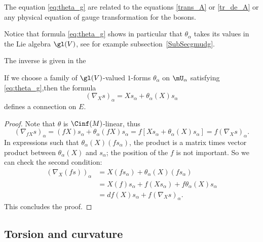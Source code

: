 \begin{normaltext}
	The equation \eqref{eq:theta_g} are related to the equations \eqref{trans_A} or \eqref{tr_de_A} or any physical equation of gauge transformation for the bosons.
\end{normaltext}

\begin{normaltext}
	Notice that formula \eqref{eq:theta_g} shows in particular that $\theta_{\alpha}$ takes its values in the Lie algebra $\gl(V)$, see for example subsection~\ref{SubSecgmudg}.
\end{normaltext}

The inverse is given in the
\begin{proposition}	\label{Propformconnve}
	If we choose a family of $\gl(V)$-valued $1$-forms $\theta_{\alpha}$ on $\mU_{\alpha}$ satisfying \eqref{eq:theta_g},then the formula
	\[
		(\nabla_Xs)_{\alpha}=Xs_{\alpha}+\theta_{\alpha}(X)s_{\alpha}
	\]
	defines a connection on $E$.\label{prop:thet_conn_F}
\end{proposition}

\begin{proof}
	Note that $\theta$ is $\Cinf(M)$-linear, thus
	\begin{equation}
		(\nabla_{fX}s)_{\alpha}=(fX)s_{\alpha}+\theta_{\alpha}(fX)s_{\alpha}
		=f[ Xs_{\alpha}+\theta_{\alpha}(X)s_{\alpha} ]
		=f(\nabla_Xs)_{\alpha}.
	\end{equation}
	In expressions such that $\theta_{\alpha}(X)(fs_{\alpha})$, the product is a matrix times vector product between $\theta_{\alpha}(X)$ and $s_{\alpha}$; the position of the $f$ is not important. So we can check the second condition:
	\begin{equation}
		\begin{split}
			(\nabla_X(fs))_{\alpha}&=X(fs_{\alpha})+\theta_{\alpha}(X)(fs_{\alpha}) \\
			&=X(f)s_{\alpha}+f(Xs_{\alpha})+f\theta_{\alpha}(X)s_{\alpha}\\
			&=df(X)s_{\alpha}+f(\nabla_Xs)_{\alpha}.
		\end{split}
	\end{equation}
	This concludes the proof.
\end{proof}


\subsection{Torsion and curvature}

